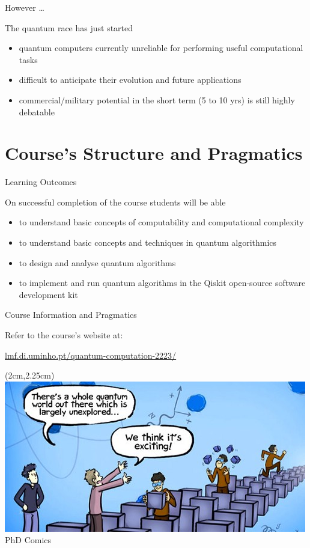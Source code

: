 \documentclass{beamer}
\begin{document}
\begin{frame}{However \dots}

        The quantum race has just started
        
        \begin{itemize}
                \item quantum computers currently \alert{unreliable} for
                        performing useful computational tasks

                \item difficult to anticipate 
                        their  evolution and future applications
                \item commercial/military potential in the short term (5 to 10 yrs) 
                        is still highly debatable
        \end{itemize}
\end{frame}

\section{Course's Structure and Pragmatics}

\begin{frame}{Learning Outcomes}

On successful completion of the course students will be able 

\begin{itemize}
\item to understand basic concepts of computability and computational complexity
\item to understand basic concepts and techniques in quantum algorithmics
\item to design and analyse quantum algorithms
\item to implement and run quantum algorithms in the Qiskit 
        open-source software development kit
\end{itemize}

\end{frame}


\begin{frame}{Course Information and Pragmatics}

Refer to the course's website at:
\begin{center}
        \url{lmf.di.uminho.pt/quantum-computation-2223/}
\end{center}

\end{frame}

\begin{frame}[plain]
  \begin{textblock*}{4cm}(2cm,2.25cm)
          \includegraphics[scale=0.5]{images/mot.jpg} 
          \tiny{PhD Comics}
  \end{textblock*}

\end{frame}
\end{document}
